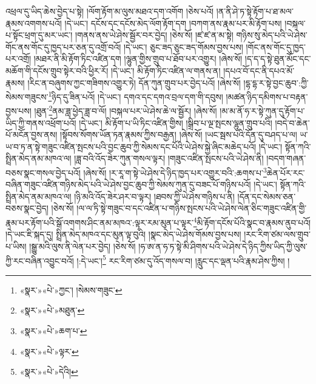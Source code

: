 འཕྲལ་དུ་ཡིད་ཆེས་བྱེད་པ་སྟེ། །ལོག་རྟོག་མ་ལུས་མཐའ་དག་འགོག །ཅེས་པའོ། །ན་ནི་ཤེ་ཏ་སྟེ་རྟོག་པ་ཐ་མལ་རྣམས་འགགས་པའོ། །དེ་ཡང་། དངོས་དང་དངོས་མེད་ལོག་རྟོག་དག །བཀག་ནས་རྣམ་པར་མི་རྟོག་པས། །བསྐལ་པ་སྟོང་ཕྲག་དུ་མར་ཡང་། །གནས་ནས་ཡེ་ཤེས་སྦྱོར་བར་བྱེད། །ཅེས་སོ། །ཛ་ཛ་ན་མ་སྟེ། གཉིས་སུ་མེད་པའི་ཡེ་ཤེས་གོང་ནས་གོང་དུ་ཁྱད་པར་ཅན་དུ་འགྲོ་བའོ། །དེ་ཡང་། ཅུང་ཟད་ཅུང་ཟད་གོམས་བྱས་པས། །གོང་ནས་གོང་དུ་ཁྱད་པར་འགྲོ། །མཐར་ནི་མི་རྟོག་ཏིང་འཛིན་དག །ལྷུན་གྱིས་གྲུབ་པ་ཐོབ་པར་འགྱུར། །ཞེས་སོ། །ད་ད་ད་སྟེ་ཐུན་མོང་དང་མཆོག་གི་དངོས་གྲུབ་སྟེར་བའི་ཕྱིར་རོ། །དེ་ཡང་། མི་རྟོག་ཏིང་འཛིན་ལ་གནས་ན། །དཔའ་བོ་དང་ནི་དཔའ་མོ་རྣམས། །རིང་ན་བཞུགས་ཀྱང་གཟིགས་འགྱུར་ཏེ། དོན་ཀུན་གྲུབ་པར་བྱེད་པའོ། །ཞེས་སོ། །དྷ་དྷ་ར་སྟེ་བྱང་ཆུབ་:ཀྱི་སེམས་གཟུངས་\footnote{«སྣར་»«པེ་»ཀྱང་། །སེམས་གཟུང་}ཉིད་དུ་ཟིན་པའོ། །དེ་ཡང་། དགའ་དང་དགའ་བྲལ་དག་གི་དབུས། །མཚན་ཉིད་དམིགས་པ་བརྟན་བྱས་པས། །ཐུན་\footnote{«སྣར་»«པེ་»མཐུན་}ནམ་ཟླ་ཕྱེད་ཟླ་བ་ལོ། །བསྐལ་པར་ཡེ་ཤེས་ཆེ་ལ་སྦྱོར། །ཞེས་སོ། །མ་མ་ནོ་ཧ་ར་སྟེ་ཀུན་དུ་རྟོག་པ་ཡིད་ཀྱི་གནས་འཕྲོག་པའོ། །དེ་ཡང་། མི་རྟོག་པ་ཡི་ཏིང་འཛིན་གྱིས། །སྒྲིབ་པ་ལྔ་སྤངས་ལྷུན་གྲུབ་པའི། །བདེ་བ་ཆེན་པོ་མངོན་བྱས་ནས། །སྟོབས་སོགས་ཡོན་ཏན་རྣམས་ཀྱིས་བརྒྱན། །ཞེས་སོ། །ཡང་སྦས་པའི་དོན་དུ་བཤད་པ་ལ། ཡ་ཡ་བ་ཏ་ན་སྟེ་གཟུང་འཛིན་སྤངས་པའི་བྱང་ཆུབ་ཀྱི་སེམས་དང་པོའི་ཡེ་ཤེས་སྐྱེ་ཞིང་མཆེད་པའོ། །དེ་ཡང་། སྟོན་ཀའི་སྤྲིན་མེད་ནམ་མཁའ་ལ། །ཟླ་བའི་འོད་ཟེར་ཀུན་གསལ་ལྟར། །གཟུང་འཛིན་སྤངས་པའི་ཡེ་ཤེས་ནི། །བདག་གཞན་བཅས་སྣང་གསལ་བྱེད་པའོ། །ཞེས་སོ། །ར་རཱ་ག་སྟེ་ཡེ་ཤེས་དེ་ཉིད་ཁྱད་པར་འགྱུར་བའི་:ཆགས་པ་\footnote{«སྣར་»«པེ་»ཆག་པ་}ཆེན་པོར་རང་བཞིན་གཟུང་འཛིན་གཉིས་མེད་པའི་ཡེ་ཤེས་བྱང་ཆུབ་ཀྱི་སེམས་ཀུན་དུ་བཟང་པོ་གཉིས་པའོ། །དེ་ཡང་། སྟོན་ཀའི་སྤྲིན་མེད་ནམ་མཁའ་ལ། །ཉི་མའི་འོད་ཟེར་ཤར་བ་ལྟར། །ཐབས་ཀྱི་ཡེ་ཤེས་གཉིས་པ་ནི། །དོན་དང་སེམས་ཅན་བཅས་སྣང་བྱེད། །ཅེས་སོ། །ལ་ལ་ཏི་སྟེ་གཟུང་བ་དང་འཛིན་པ་གཉིས་སྤངས་པའི་ཡེ་ཤེས་ལེན་ཅིང་གཟུང་འཛིན་གྱི་རྣམ་པར་རྟོག་པའི་སྒོ་འགགས་ཤིང་ནམ་མཁའ་:ལྟར་རམ་མུན་པ་ལྟར་\footnote{«སྣར་»«པེ་»ལྟར་}མི་རྟོག་དངོས་པོའི་སྣང་བ་རྣམས་ནུབ་པའོ། །དེ་ཡང་ཇི་སྐད་དུ། སྤྲིན་མེད་མཁའ་དང་མུན་ལྟ་བུའི། །སྣང་མེད་ཡེ་ཤེས་གོམས་བྱས་པས། །རང་རིག་ཙམ་ལས་གྲུབ་པ་ཡིས། །སྒྱུ་མའི་ལུས་ནི་ལེན་པར་བྱེད། །ཅེས་སོ། །ཧ་ཨ་ན་ཧ་ཏ་སྟེ་མི་ཤིགས་པའི་ཡེ་ཤེས་དེ་ཉིད་ཀྱིས་ཡིད་ཀྱི་ལུས་ཀྱི་རང་བཞིན་འབྱུང་བའོ། །:དེ་ཡང་།\footnote{«སྣར་»«པེ་»དེའི།} རང་རིག་ཙམ་དུ་འོད་གསལ་བ། །རླུང་དང་ལྡན་པའི་རྣམ་ཤེས་ཀྱིས། །
